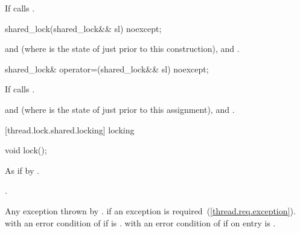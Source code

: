 \begin{itemdescr}
\pnum
\effects If  calls .
\end{itemdescr}

%
\begin{itemdecl}
shared_lock(shared_lock&& sl) noexcept;
\end{itemdecl}

\begin{itemdescr}
\pnum
\postconditions {} and  (where
 is the state of  just prior to this construction),
 and .
\end{itemdescr}

%
\begin{itemdecl}
shared_lock& operator=(shared_lock&& sl) noexcept;
\end{itemdecl}

\begin{itemdescr}
\pnum
\effects If  calls .

\pnum
\postconditions {} and  (where
 is the state of  just prior to this assignment),
 and .
\end{itemdescr}

[thread.lock.shared.locking]{ locking}

%
%
\begin{itemdecl}
void lock();
\end{itemdecl}

\begin{itemdescr}
\pnum
\effects As if by .

\pnum
\postconditions {}.

\pnum
\throws Any exception thrown by .
 if an exception is required~(\ref{thread.req.exception}).
 with an error condition of
 if  is .
 with an error condition of
 if on entry  is .
\end{itemdescr}

